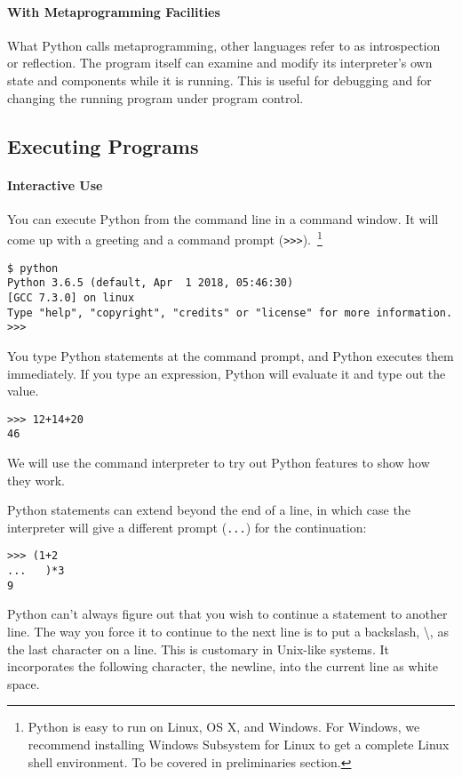\paragraph{With Metaprogramming Facilities}
What Python calls metaprogramming,
other languages refer to as introspection or reflection. The program
itself can examine and modify its interpreter's own state and components
while it is running. This is useful for debugging and for changing the
running program under program control.

\subsection{Executing Programs}
\label{executing-programs}

\paragraph{Interactive Use}
\label{interactive-use}
You can execute Python from the
command line in a command window. It will come up with a greeting and a
command prompt (\verb">>>").~\footnote{Python is easy to run on Linux, OS X, and Windows. For Windows, we recommend installing Windows Subsystem for Linux to get a complete Linux shell environment. To be covered in preliminaries section.}

\begin{verbatim}
$ python
Python 3.6.5 (default, Apr  1 2018, 05:46:30) 
[GCC 7.3.0] on linux
Type "help", "copyright", "credits" or "license" for more information.
>>> 
\end{verbatim}

You type Python statements at the
command prompt, and Python executes them immediately. If you type an
expression, Python will evaluate it and type out the value.

\begin{verbatim}
>>> 12+14+20
46
\end{verbatim}

We will use the command interpreter
to try out Python features to show how they work.

Python statements can extend beyond
the end of a line, in which case the interpreter will give a different
prompt (\verb"...") for the continuation:

\begin{verbatim}
>>> (1+2
...   )*3
9
\end{verbatim}

Python can't always figure out
that you wish to continue a statement to another line. The way you force
it to continue to the next line is to put a backslash, \textbackslash{},
as the last character on a line. This is customary in Unix-like systems.
It incorporates the following character, the newline, into the current
line as white space.

